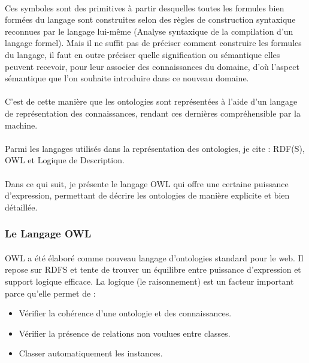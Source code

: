 \documentclass[12pt, a4paper, oneside]{book}
\begin{document}
\paragraph{}
Ces symboles sont des primitives à partir desquelles toutes les formules bien formées du langage sont construites selon des règles de construction syntaxique reconnues par le langage lui-même (Analyse syntaxique de la compilation d'un langage formel). Mais il ne suffit pas de préciser comment construire les formules du langage, il faut en outre préciser quelle signification ou sémantique elles peuvent recevoir, pour leur associer des connaissances du domaine, d'où l'aspect sémantique que l'on souhaite introduire dans ce nouveau domaine.
\paragraph{}
C'est de cette manière que les ontologies sont représentées à l'aide d'un langage de représentation des connaissances, rendant ces dernières compréhensible par la machine.
\paragraph{}
Parmi les langages utilisés dans la représentation des ontologies, je cite : RDF(S), OWL et Logique de Description.
\paragraph{}
Dans ce qui suit, je présente le langage OWL qui offre une certaine puissance d'expression, permettant de décrire les ontologies de manière explicite et bien détaillée.

\subsubsection{Le Langage OWL}
\paragraph{}
OWL a été élaboré comme nouveau langage d'ontologies standard pour le web. Il repose sur RDFS et tente de trouver un équilibre entre puissance d'expression et support logique efficace. La logique (le raisonnement) est un facteur important parce qu'elle permet de :
\begin{itemize}
\item Vérifier la cohérence d'une ontologie et des connaissances.
\item Vérifier la présence de relations non voulues entre classes.
\item Classer automatiquement les instances.
\end{itemize}
\end{document}
